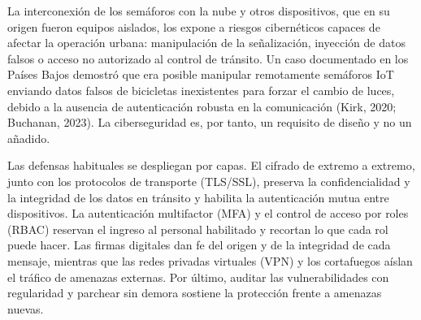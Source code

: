 La interconexión de los semáforos con la nube y otros dispositivos, que en su origen fueron equipos aislados,
los expone a riesgos cibernéticos capaces de afectar la operación urbana: manipulación de la señalización,
inyección de datos falsos o acceso no autorizado al control de tránsito. Un caso documentado en los Países
Bajos demostró que era posible manipular remotamente semáforos IoT enviando datos falsos de bicicletas
inexistentes para forzar el cambio de luces, debido a la ausencia de autenticación robusta en la comunicación
(Kirk, 2020; Buchanan, 2023). La ciberseguridad es, por tanto, un requisito de diseño y no un añadido.

Las defensas habituales se despliegan por capas. El cifrado de extremo a extremo, junto con los protocolos de
transporte (TLS/SSL), preserva la confidencialidad y la integridad de los datos en tránsito y habilita la
autenticación mutua entre dispositivos. La autenticación multifactor (MFA) y el control de acceso por roles
(RBAC) reservan el ingreso al personal habilitado y recortan lo que cada rol puede hacer. Las firmas
digitales dan fe del origen y de la integridad de cada mensaje, mientras que las redes privadas virtuales
(VPN) y los cortafuegos aíslan el tráfico de amenazas externas. Por último, auditar las vulnerabilidades con
regularidad y parchear sin demora sostiene la protección frente a amenazas nuevas.

